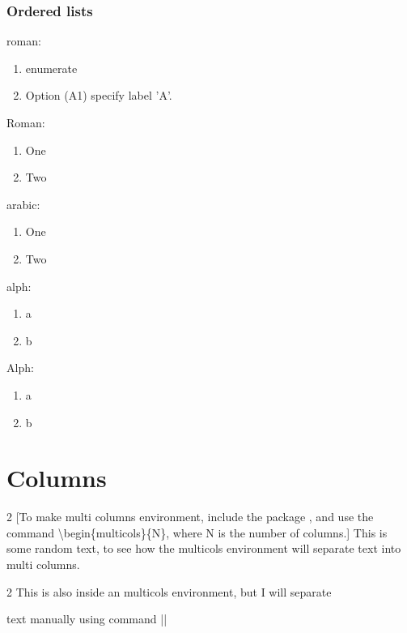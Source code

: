 \subsubsection{Ordered lists}

roman:	\\
\begin{enumerate}[label = (\roman*)]	%
    \item enumerate
    \item Option (A1) specify label 'A'.
\end{enumerate}

Roman:
\begin{enumerate}[label=(\Roman*)]
    \item One
    \item Two
\end{enumerate}

arabic:
\begin{enumerate}[label = (\arabic*)]
    \item One
    \item Two
\end{enumerate}

alph:
\begin{enumerate}[label = (\alph*)]
    \item a
    \item b
\end{enumerate}

Alph:
\begin{enumerate}[label = (\Alph*)]
    \item a
    \item b
\end{enumerate}

\section{Columns}
\begin{multicols}{2}
[To make multi columns environment, include the package , and use the command \textbackslash{}begin\{multicols\}\{N\}, where N is the number of columns.]
    This is some random text, to see how the multicols environment will separate text into multi columns.
\end{multicols}

\begin{multicols}{2}
    This is also inside an multicols environment, but I will separate

    \columnbreak

    text manually using command \command|\columnbreak|
\end{multicols}


